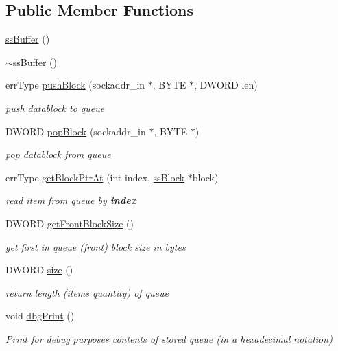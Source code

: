 \subsection*{Public Member Functions}
\begin{DoxyCompactItemize}
\item 
\hyperlink{classssBuffer_a073b3e5c7912f581049b96378b9506cd}{ssBuffer} ()
\item 
\hyperlink{classssBuffer_a51db3d2ee80dafe3c460a197232857ea}{$\sim$ssBuffer} ()
\item 
errType \hyperlink{classssBuffer_aedd5b2d9bbf7b2ad1161fced3f2b3250}{pushBlock} (sockaddr\_\-in $\ast$, BYTE $\ast$, DWORD len)
\begin{DoxyCompactList}\small\item\em push datablock to queue \item\end{DoxyCompactList}\item 
DWORD \hyperlink{classssBuffer_ad149db0b097643446ac21a53e34c9f6c}{popBlock} (sockaddr\_\-in $\ast$, BYTE $\ast$)
\begin{DoxyCompactList}\small\item\em pop datablock from queue \item\end{DoxyCompactList}\item 
errType \hyperlink{classssBuffer_aaa87641fe53f9fc9a7a87e2ff123f1ec}{getBlockPtrAt} (int index, \hyperlink{structssBlock}{ssBlock} $\ast$block)
\begin{DoxyCompactList}\small\item\em read item from queue by {\bfseries index} \item\end{DoxyCompactList}\item 
DWORD \hyperlink{classssBuffer_a5ab17bc4d89e0f4f3bb7214c1ddc585f}{getFrontBlockSize} ()
\begin{DoxyCompactList}\small\item\em get first in queue (front) block size in bytes \item\end{DoxyCompactList}\item 
DWORD \hyperlink{classssBuffer_a6dc6df470ef6965a237b130fc7a17988}{size} ()
\begin{DoxyCompactList}\small\item\em return length (items quantity) of queue \item\end{DoxyCompactList}\item 
void \hyperlink{classssBuffer_a2b3f0ceae905ebdd2e7057291f6d4bc9}{dbgPrint} ()
\begin{DoxyCompactList}\small\item\em Print for debug purposes contents of stored queue (in a hexadecimal notation) \item\end{DoxyCompactList}\end{DoxyCompactItemize}
